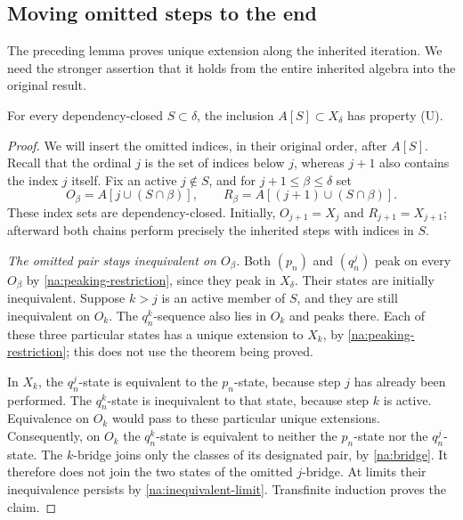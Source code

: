 \subsection{Moving omitted steps to the end}

The preceding lemma proves unique extension along the inherited
iteration. We need the stronger assertion that it holds from the
entire inherited algebra into the original result.

\begin{theorem}\label{na:closed-extension}
For every dependency-closed $S\subset\delta$, the inclusion
$A[S]\subset X_\delta$ has property \textup{(U)}.
\end{theorem}
\begin{proof}
We will insert the omitted indices, in their original order, after
$A[S]$. Recall that the ordinal $j$ is the set of indices below $j$,
whereas $j+1$ also contains the index $j$ itself.
Fix an active $j\notin S$, and for
$j+1\le\beta\le\delta$ set
\begin{equation}\label{eq:reordered-bases}
 O_\beta=A[j\cup(S\cap\beta)],\qquad
 R_\beta=A[(j+1)\cup(S\cap\beta)].
\end{equation}
These index sets are dependency-closed. Initially,
$O_{j+1}=X_j$ and $R_{j+1}=X_{j+1}$; afterward both chains
perform precisely the inherited steps with indices in $S$.

\smallskip\noindent
\emph{The omitted pair stays inequivalent on $O_\beta$.}
Both $(p_n)$ and $(q_n^j)$ peak on every $O_\beta$ by
\cref{na:peaking-restriction}, since they peak in $X_\delta$.
Their states are initially inequivalent. Suppose $k>j$ is an active
member of $S$, and they are still inequivalent on $O_k$.
The $q_n^k$-sequence also lies in $O_k$ and peaks there.
Each of these three particular states has a unique extension to
$X_k$, by \cref{na:peaking-restriction}; this does not use the
theorem being proved.

In $X_k$, the $q_n^j$-state is equivalent to the $p_n$-state,
because step $j$ has already been performed. The $q_n^k$-state is
inequivalent to that state, because step $k$ is active. Equivalence
on $O_k$ would pass to these particular unique extensions.
Consequently, on $O_k$ the $q_n^k$-state is equivalent to neither
the $p_n$-state nor the $q_n^j$-state. The $k$-bridge joins only
the classes of its designated pair, by \cref{na:bridge}. It therefore
does not join the two states of the omitted $j$-bridge.
At limits their inequivalence persists by
\cref{na:inequivalent-limit}. Transfinite induction proves the claim.


\end{proof}
